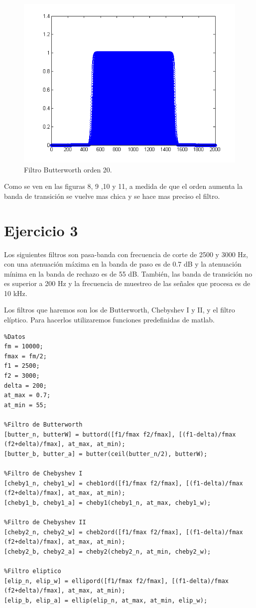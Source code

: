 \documentclass[10pt,a4paper,final]{article}
\begin{document}
\begin{figure}[h!]
\centering
  \caption{Filtro Butterworth orden 20.}
  \label{fig:res120}
  \includegraphics[scale=0.5]{fig11.png}
    
\end{figure}

Como se ven en las figuras 8, 9 ,10 y 11, a medida de que el orden aumenta la banda de transición se vuelve mas chica y se hace mas preciso el filtro.

\section{Ejercicio 3}
Los siguientes filtros son pasa-banda con frecuencia de corte de 2500 y 3000 Hz, con una atenuación máxima en la banda de paso es de 0.7 dB y la atenuación mínima en la banda de rechazo es de 55 dB. También, las banda de transición no es superior a 200 Hz y la frecuencia de muestreo de las señales que procesa es de 10 kHz.

Los filtros que haremos son los de Butterworth, Chebyshev I y II, y el filtro elíptico. Para hacerlos utilizaremos funciones predefinidas de matlab.

\begin{lstlisting}
%Datos
fm = 10000;
fmax = fm/2;
f1 = 2500;
f2 = 3000;
delta = 200;
at_max = 0.7;
at_min = 55;

%Filtro de Butterworth
[butter_n, butterW] = buttord([f1/fmax f2/fmax], [(f1-delta)/fmax (f2+delta)/fmax], at_max, at_min);
[butter_b, butter_a] = butter(ceil(butter_n/2), butterW);

%Filtro de Chebyshev I
[cheby1_n, cheby1_w] = cheb1ord([f1/fmax f2/fmax], [(f1-delta)/fmax (f2+delta)/fmax], at_max, at_min);
[cheby1_b, cheby1_a] = cheby1(cheby1_n, at_max, cheby1_w);

%Filtro de Chebyshev II
[cheby2_n, cheby2_w] = cheb2ord([f1/fmax f2/fmax], [(f1-delta)/fmax (f2+delta)/fmax], at_max, at_min);
[cheby2_b, cheby2_a] = cheby2(cheby2_n, at_min, cheby2_w);

%Filtro eliptico
[elip_n, elip_w] = ellipord([f1/fmax f2/fmax], [(f1-delta)/fmax (f2+delta)/fmax], at_max, at_min);
[elip_b, elip_a] = ellip(elip_n, at_max, at_min, elip_w);

\end{lstlisting}
\end{document}
